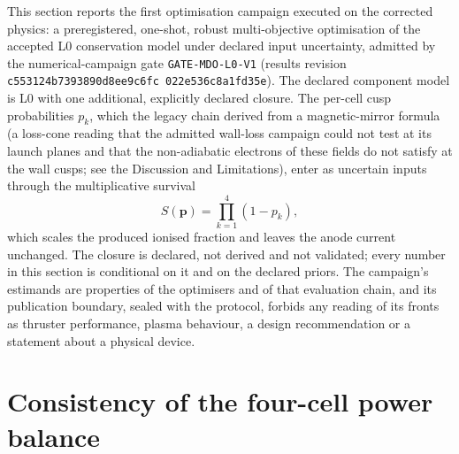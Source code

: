 \documentclass[11pt]{article}
\newcommand{\MdoEvidenceRevision}{\texttt{c553124b\allowbreak{}7393890d\allowbreak{}8ee9c6fc\allowbreak{}%
022e536c\allowbreak{}8a1fd35e}}
\begin{document}
This section reports the first optimisation campaign executed on the corrected
physics: a preregistered, one-shot, robust multi-objective optimisation of the
accepted L0 conservation model under declared input uncertainty, admitted by
the numerical-campaign gate \texttt{GATE-MDO-L0-V1} (results revision
\MdoEvidenceRevision). The declared component model is L0 with one additional,
explicitly declared closure. The per-cell cusp probabilities $p_k$, which the
legacy chain derived from a magnetic-mirror formula (a loss-cone reading that the
admitted wall-loss campaign could not test at its launch planes and that the
non-adiabatic electrons of these fields do not satisfy at the wall cusps; see the
Discussion and Limitations), enter as uncertain inputs through the multiplicative
survival
\begin{equation}
  S(\mathbf p)=\prod_{k=1}^{4}(1-p_k),
\end{equation}
which scales the produced ionised fraction and leaves the anode current
unchanged. The closure is declared, not derived and not validated; every number
in this section is conditional on it and on the declared priors. The campaign's
estimands are properties of the optimisers and of that evaluation chain, and
its publication boundary, sealed with the protocol, forbids any reading of its
fronts as thruster performance, plasma behaviour, a design recommendation or a
statement about a physical device.



\section{Consistency of the four-cell power balance}
\label{sec:four-cell-closure}
\end{document}
